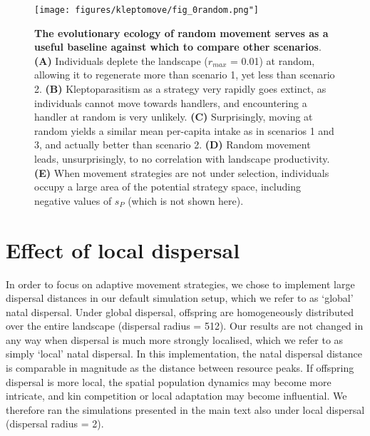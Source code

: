 {\begin{figure}
    \centering
    \texttt{[image: figures/kleptomove/fig\_0random.png"]}
    \caption{\textbf{The evolutionary ecology of random movement serves as a useful baseline against which to compare other scenarios}. \textbf{(A)} Individuals deplete the landscape (\(r_{max}\) = 0.01) at random, allowing it to regenerate more than scenario 1, yet less than scenario 2. \textbf{(B)} Kleptoparasitism as a strategy very rapidly goes extinct, as individuals cannot move towards handlers, and encountering a handler at random is very unlikely. \textbf{(C)} Surprisingly, moving at random yields a similar mean per-capita intake as in scenarios 1 and 3, and actually better than scenario 2. \textbf{(D)} Random movement leads, unsurprisingly, to no correlation with landscape productivity. \textbf{(E)} When movement strategies are not under selection, individuals occupy a large area of the potential strategy space, including negative values of \(s_P\) (which is not shown here).}
    \label{fig:klept_move_random}
\end{figure}

\section*{Effect of local dispersal}

In order to focus on adaptive movement strategies, we chose to implement large dispersal distances in our default simulation setup, which we refer to as `global' natal dispersal.
Under global dispersal, offspring are homogeneously distributed over the entire landscape (dispersal radius = 512).
Our results are not changed in any way when dispersal is much more strongly localised, which we refer to as simply `local' natal dispersal.
In this implementation, the natal dispersal distance is comparable in magnitude as the distance between resource peaks.
If offspring dispersal is more local, the spatial population dynamics may become more intricate, and kin competition or local adaptation may become influential. We therefore ran the simulations presented in the main text also under local dispersal (dispersal radius = 2).

}
